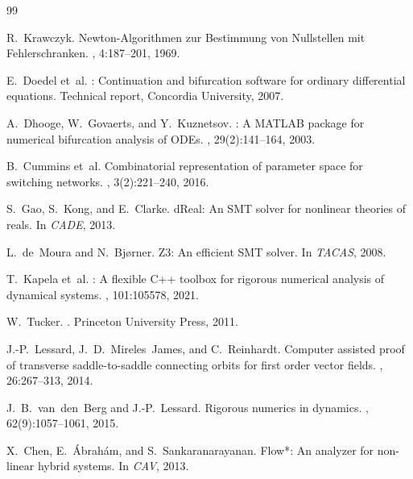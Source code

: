 \documentclass[11pt]{article}
\begin{document}

\begin{thebibliography}{99}

R.~Krawczyk.
\newblock Newton-{A}lgorithmen zur {B}estimmung von {N}ullstellen mit {F}ehlerschranken.
, 4:187--201, 1969.

E.~Doedel et~al.
: Continuation and bifurcation software for ordinary differential equations.
\newblock Technical report, Concordia University, 2007.

A.~Dhooge, W.~Govaerts, and Y.~Kuznetsov.
: A {MATLAB} package for numerical bifurcation analysis of {ODE}s.
, 29(2):141--164, 2003.

B.~Cummins et~al.
\newblock Combinatorial representation of parameter space for switching networks.
, 3(2):221--240, 2016.

S.~Gao, S.~Kong, and E.~Clarke.
\newblock d{R}eal: An {SMT} solver for nonlinear theories of reals.
\newblock In {\em CADE}, 2013.

L.~de~Moura and N.~Bj{\o}rner.
\newblock Z3: An efficient {SMT} solver.
\newblock In {\em TACAS}, 2008.

T.~Kapela et~al.
: A flexible {C++} toolbox for rigorous numerical analysis of dynamical systems.
, 101:105578, 2021.

W.~Tucker.
.
\newblock Princeton University Press, 2011.

J.-P.~Lessard, J.~D.~Mireles~James, and C.~Reinhardt.
\newblock Computer assisted proof of transverse saddle-to-saddle connecting orbits for first order vector fields.
, 26:267--313, 2014.

J.~B.~van~den~Berg and J.-P.~Lessard.
\newblock Rigorous numerics in dynamics.
, 62(9):1057--1061, 2015.

X.~Chen, E.~{\'A}brah{\'a}m, and S.~Sankaranarayanan.
\newblock Flow*: An analyzer for non-linear hybrid systems.
\newblock In {\em CAV}, 2013.


\end{thebibliography}
\end{document}
